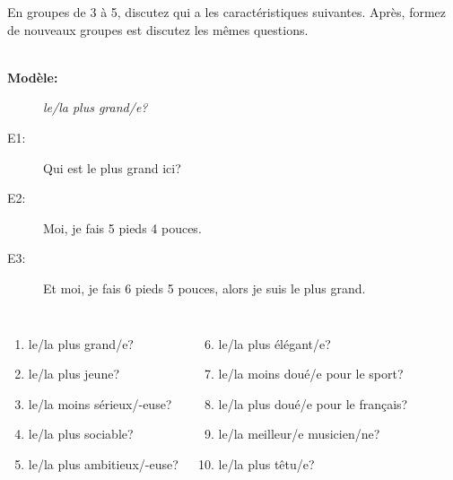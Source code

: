 \begin{frame}{}
  En groupes de 3 à 5, discutez qui a les caractéristiques suivantes.
  Après, formez de nouveaux groupes est discutez les mêmes questions. \\
   \\
  \begin{description}
    \item[\textbf{Modèle:}] \emph{le/la plus grand/e?}
    \item[E1:] Qui est le plus grand ici?
    \item[E2:] Moi, je fais 5 pieds 4 pouces.
    \item[E3:] Et moi, je fais 6 pieds 5 pouces, alors je suis le plus grand.
  \end{description}
  \begin{columns}[t]
      \begin{enumerate}
        \item le/la plus grand/e?
        \item le/la plus jeune?
        \item le/la moins sérieux/-euse?
        \item le/la plus sociable?
        \item le/la plus ambitieux/-euse?
      \end{enumerate}
      \begin{enumerate}
        \setcounter{enumi}{5}
        \item le/la plus élégant/e?
        \item le/la moins doué/e pour le sport?
        \item le/la plus doué/e pour le français?
        \item le/la meilleur/e musicien/ne?
        \item le/la plus têtu/e?
      \end{enumerate}
  \end{columns}
\end{frame}